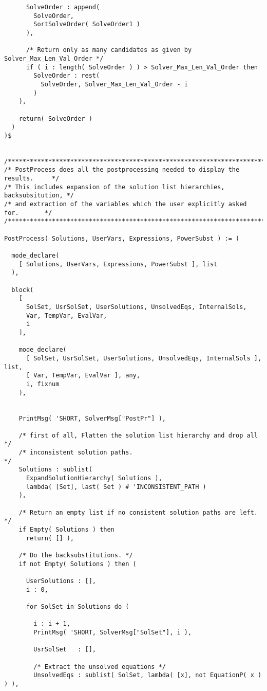 \begin{verbatim}
      SolveOrder : append(
        SolveOrder,
        SortSolveOrder( SolveOrder1 )
      ),

      /* Return only as many candidates as given by Solver_Max_Len_Val_Order */
      if ( i : length( SolveOrder ) ) > Solver_Max_Len_Val_Order then
        SolveOrder : rest(
          SolveOrder, Solver_Max_Len_Val_Order - i
        )
    ),

    return( SolveOrder )
  )
)$


/******************************************************************************/
/* PostProcess does all the postprocessing needed to display the results.     */
/* This includes expansion of the solution list hierarchies, backsubsitution, */
/* and extraction of the variables which the user explicitly asked for.       */
/******************************************************************************/

PostProcess( Solutions, UserVars, Expressions, PowerSubst ) := (

  mode_declare(
    [ Solutions, UserVars, Expressions, PowerSubst ], list
  ),

  block(
    [
      SolSet, UsrSolSet, UserSolutions, UnsolvedEqs, InternalSols,
      Var, TempVar, EvalVar, 
      i
    ],

    mode_declare(
      [ SolSet, UsrSolSet, UserSolutions, UnsolvedEqs, InternalSols ], list,
      [ Var, TempVar, EvalVar ], any,
      i, fixnum
    ),


    PrintMsg( 'SHORT, SolverMsg["PostPr"] ),

    /* first of all, Flatten the solution list hierarchy and drop all */
    /* inconsistent solution paths.                                   */
    Solutions : sublist(
      ExpandSolutionHierarchy( Solutions ),
      lambda( [Set], last( Set ) # 'INCONSISTENT_PATH )
    ),

    /* Return an empty list if no consistent solution paths are left. */
    if Empty( Solutions ) then
      return( [] ),

    /* Do the backsubstitutions. */
    if not Empty( Solutions ) then (

      UserSolutions : [],
      i : 0,

      for SolSet in Solutions do (

        i : i + 1,
        PrintMsg( 'SHORT, SolverMsg["SolSet"], i ),

        UsrSolSet   : [],

        /* Extract the unsolved equations */
        UnsolvedEqs : sublist( SolSet, lambda( [x], not EquationP( x ) ) ),


\end{verbatim}
